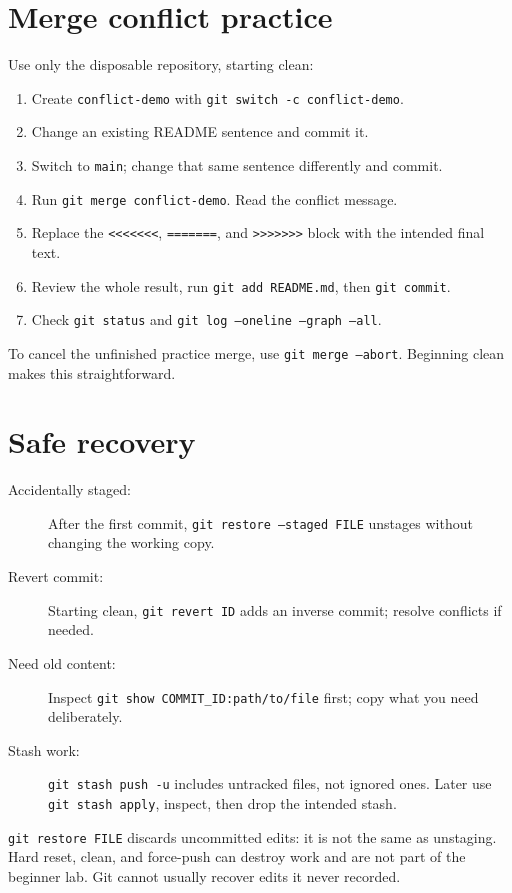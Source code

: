 \documentclass[11pt]{article}
\begin{document}
\section{Merge conflict practice}
Use only the disposable repository, starting clean:
\begin{enumerate}
\item Create \texttt{conflict-demo} with \texttt{git switch -c conflict-demo}.
\item Change an existing README sentence and commit it.
\item Switch to \texttt{main}; change that same sentence differently and commit.
\item Run \texttt{git merge conflict-demo}. Read the conflict message.
\item Replace the \texttt{<<<<<<<}, \texttt{=======}, and
\texttt{>>>>>>>} block with the intended final text.
\item Review the whole result, run \texttt{git add README.md}, then
\texttt{git commit}.
\item Check \texttt{git status} and
\texttt{git log --oneline --graph --all}.
\end{enumerate}
To cancel the unfinished practice merge, use \texttt{git merge --abort}.
Beginning clean makes this straightforward.

\section{Safe recovery}
\begin{description}
\item[Accidentally staged:] After the first commit,
\texttt{git restore --staged FILE} unstages without changing the working copy.
\item[Revert commit:] Starting clean, \texttt{git revert ID} adds an inverse
commit; resolve conflicts if needed.
\item[Need old content:] Inspect \texttt{git show COMMIT\_ID:path/to/file}
first; copy what you need deliberately.
\item[Stash work:] \texttt{git stash push -u} includes untracked files, not
ignored ones. Later use \texttt{git stash apply}, inspect, then drop the
intended stash.
\end{description}
\texttt{git restore FILE} discards uncommitted edits: it is not the same as
unstaging. Hard reset, clean, and force-push can destroy work and are not
part of the beginner lab. Git cannot usually recover edits it never recorded.
\end{document}
